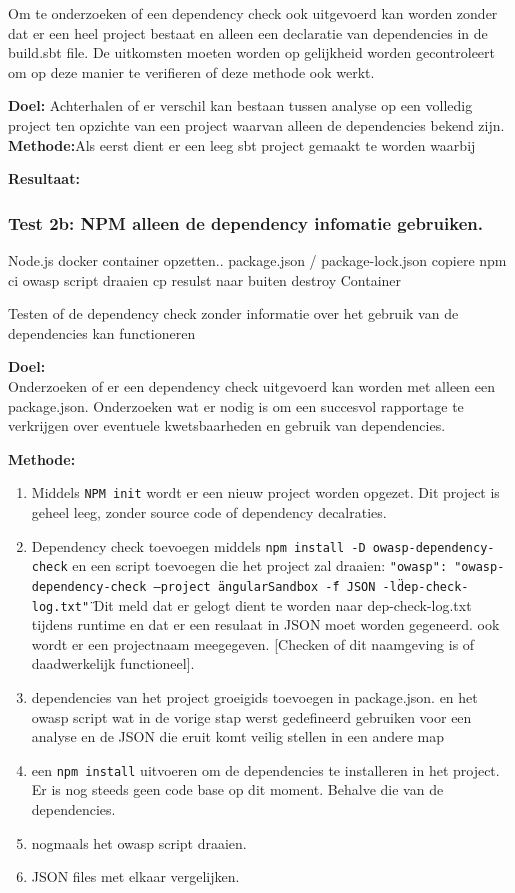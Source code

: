 Om te onderzoeken of een dependency check ook uitgevoerd kan worden zonder dat er een heel project bestaat en alleen een declaratie van dependencies in de build.sbt file. De uitkomsten moeten worden op gelijkheid worden gecontroleert om op deze manier te verifieren of deze methode ook werkt.

\textbf{Doel:} Achterhalen of er verschil kan bestaan tussen analyse op een volledig project ten opzichte van een project waarvan alleen de dependencies bekend zijn.
\textbf{Methode:}Als eerst dient er een leeg sbt project gemaakt te worden waarbij

\textbf{Resultaat:}


\subsubsection{Test 2b: NPM alleen de dependency infomatie gebruiken.}
Node.js docker container opzetten..
package.json / package-lock.json copiere
npm ci
owasp script draaien
cp resulst naar buiten
destroy Container


Testen of de dependency check zonder informatie over het gebruik van de dependencies kan functioneren

\textbf{Doel:}\\ Onderzoeken of er een dependency check uitgevoerd kan worden met alleen een package.json. Onderzoeken wat er nodig is om een succesvol rapportage te verkrijgen over eventuele kwetsbaarheden en gebruik van dependencies.

\textbf{Methode:}

\begin{enumerate}
    \item Middels \texttt{NPM init} wordt er een nieuw project worden opgezet. Dit project is geheel leeg, zonder source code of dependency decalraties.
    \item Dependency check toevoegen middels \texttt{npm install -D owasp-dependency-check} en een script toevoegen die het project zal draaien: \texttt{"owasp": "owasp-dependency-check --project \" angularSandbox \" -f JSON -l\"dep-check-log.txt\" "}%
    Dit meld dat er gelogt dient te worden naar dep-check-log.txt tijdens runtime en dat er een resulaat in JSON moet worden gegeneerd. ook wordt er een projectnaam meegegeven. [Checken of dit naamgeving is of daadwerkelijk functioneel].
    \item dependencies van het project groeigids toevoegen in package.json. en het owasp script wat in de vorige stap werst gedefineerd gebruiken voor een analyse en de JSON die eruit komt veilig stellen in een andere map
    \item een \texttt{npm install} uitvoeren om de dependencies te installeren in het project. Er is nog steeds geen code base op dit moment. Behalve die van de dependencies.
    \item nogmaals het owasp script draaien.
    \item JSON files met elkaar vergelijken.
\end{enumerate}


